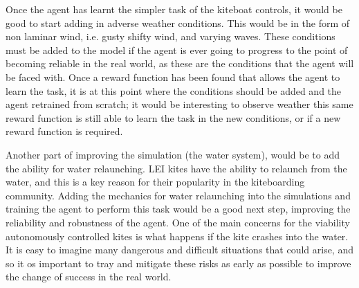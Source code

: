 Once the agent has learnt the simpler task of the kiteboat controls, it would be good to start adding in adverse weather conditions. This would be in the form of non laminar wind, i.e. gusty shifty wind, and varying waves. These conditions must be added to the model if the agent is ever going to progress to the point of becoming reliable in the real world, as these are the conditions that the agent will be faced with. Once a reward function has been found that allows the agent to learn the task, it is at this point where the conditions should be added and the agent retrained from scratch; it would be interesting to observe weather this same reward function is still able to learn the task in the new conditions, or if a new reward function is required.

Another part of improving the simulation (the water system), would be to add the ability for water relaunching. LEI kites have the ability to relaunch from the water, and this is a key reason for their popularity in the kiteboarding community. Adding the mechanics for water relaunching into the simulations and training the agent to perform this task would be a good next step, improving the reliability and robustness of the agent. One of the main concerns for the viability autonomously controlled kites is what happens if the kite crashes into the water. It is easy to imagine many dangerous and difficult situations that could arise, and so it os important to tray and mitigate these risks as early as possible to improve the change of success in the real world.